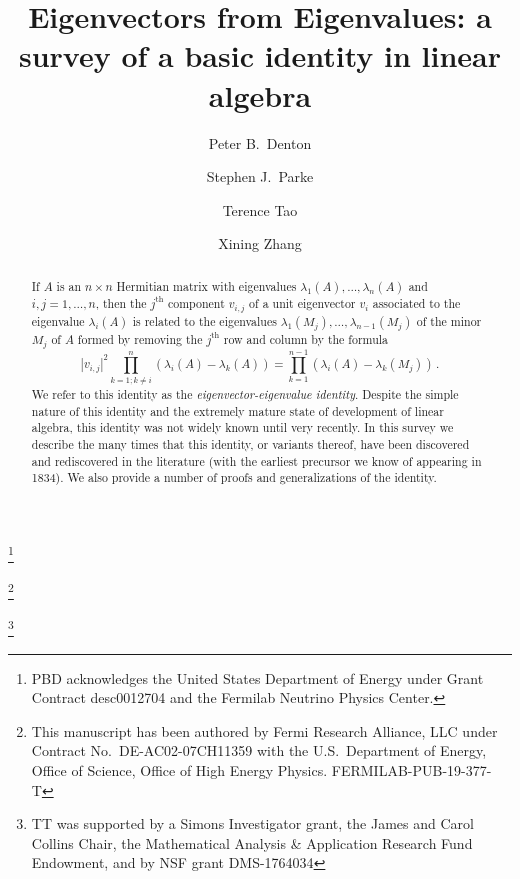 \documentclass{amsart}
\begin{document}
\title[Eigenvectors from eigenvalues]{Eigenvectors from Eigenvalues: a survey of a basic identity in linear algebra}

\author{Peter B.~Denton}
\address{Department of Physics, Brookhaven National Laboratory, Upton, NY 11973, USA}
\thanks{PBD acknowledges the United States Department of Energy under Grant Contract desc0012704 and the Fermilab Neutrino Physics Center.}

\author{Stephen J.~Parke}
\address{Theoretical Physics Department, Fermi National Accelerator Laboratory, Batavia, IL 60510, USA}
\thanks{This manuscript has been authored by Fermi Research Alliance, LLC under Contract No.~DE-AC02-07CH11359 with the U.S.~Department of Energy, Office of Science, Office of High Energy Physics.
FERMILAB-PUB-19-377-T}

\author{Terence Tao}
\address{Department of Mathematics, UCLA, Los Angeles CA 90095-1555}
 \thanks{TT was supported by a Simons Investigator grant, the James and Carol Collins Chair, the Mathematical Analysis \& Application Research Fund Endowment, and by NSF grant DMS-1764034}

\author{Xining Zhang}
\address{Enrico Fermi Institute \& Department of Physics, University of Chicago, Chicago, IL 60637, USA}

\begin{abstract}  If $A$ is an $n \times n$ Hermitian matrix with eigenvalues $\lambda_1(A),\dots,\lambda_n(A)$ and $i,j = 1,\dots,n$, then the $j^{\mathrm{th}}$ component $v_{i,j}$ of a unit eigenvector $v_i$ associated to the eigenvalue $\lambda_i(A)$ is related to the eigenvalues $\lambda_1(M_j),\dots,\lambda_{n-1}(M_j)$ of the minor $M_j$ of $A$ formed by removing the $j^{\mathrm{th}}$ row and column by the formula
$$ |v_{i,j}|^2\prod_{k=1;k\neq i}^{n}\left(\lambda_i(A)-\lambda_k(A)\right)=\prod_{k=1}^{n-1}\left(\lambda_i(A)-\lambda_k(M_j)\right)\,.$$
We refer to this identity as the \emph{eigenvector-eigenvalue identity}.  Despite the simple nature of this identity and the extremely mature state of development of linear algebra, this identity was not widely known until very recently.  In this survey we describe the many times that this identity, or variants thereof, have been discovered and rediscovered in the literature (with the earliest precursor we know of appearing in 1834).  We also provide a number of proofs and generalizations of the identity.  
\end{abstract}
\end{document}
